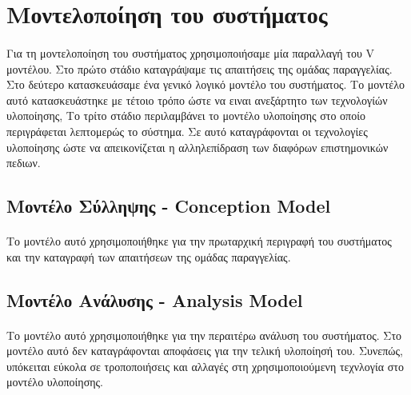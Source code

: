 \documentclass[a4paper,12pt,twoside]{report}
\begin{document}
		\section{Μοντελοποίηση του συστήματος}
		
			\paragraph{} {Για τη μοντελοποίηση του συστήματος χρησιμοποιήσαμε μία παραλλαγή του V μοντέλου. Στο πρώτο στάδιο καταγράψαμε τις απαιτήσεις της ομάδας παραγγελίας. Στο δεύτερο κατασκευάσαμε ένα γενικό λογικό μοντέλο του συστήματος. Το μοντέλο αυτό κατασκευάστηκε με τέτοιο τρόπο ώστε να ειναι ανεξάρτητο των τεχνολογίών υλοποίησης, Το τρίτο στάδιο περιλαμβάνει το μοντέλο υλοποίησης στο οποίο περιγράφεται λεπτομερώς το σύστημα. Σε αυτό καταγράφονται οι τεχνολογίες υλοποίησης ώστε να απεικονίζεται η αλληλεπίδραση των διαφόρων επιστημονικών πεδιων.
			}

			\subsection{Μοντέλο Σύλληψης - Conception Model}
			
				\paragraph{} {Το μοντέλο αυτό χρησιμοποιήθηκε για την πρωταρχική περιγραφή του συστήματος και την καταγραφή των απαιτήσεων της ομάδας παραγγελίας.
				}
			
			\subsection{Μοντέλο Ανάλυσης - Analysis Model}
			
				\paragraph{} {Το μοντέλο αυτό χρησιμοποιήθηκε για την περαιτέρω ανάλυση του συστήματος. Στο μοντέλο αυτό δεν καταγράφονται αποφάσεις για την τελική υλοποίησή του. Συνεπώς, υπόκειται εύκολα σε τροποποιήσεις και αλλαγές στη χρησιμοποιούμενη τεχνλογία στο μοντέλο υλοποίησης.
				}			
			
\end{document}
